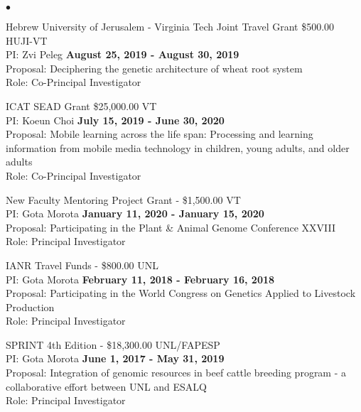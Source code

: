 \documentclass[margin,line,10pt]{res}
\newenvironment{list2}{
  \begin{list}{$\bullet$}{%
      \setlength{\itemsep}{0in}
      \setlength{\parsep}{0in} \setlength{\parskip}{0in}
      \setlength{\topsep}{0in} \setlength{\partopsep}{0in} 
      \setlength{\leftmargin}{0.2in}}}{\end{list}}
\begin{document}
\begin{resume}
\begin{list2}


\item  Hebrew University of Jerusalem - Virginia Tech Joint Travel Grant \$500.00  \hfill HUJI-VT\\
PI: Zvi Peleg  \hfill \textbf{August 25, 2019 - August 30, 2019}\\
Proposal: Deciphering the genetic architecture of wheat root system \\
Role: Co-Principal Investigator \\


\vspace{0.5cm}



\item ICAT SEAD Grant \$25,000.00  \hfill VT\\
PI: Koeun Choi  \hfill \textbf{July 15, 2019 - June 30, 2020}\\
Proposal:  Mobile learning across the life span: Processing and learning information from mobile media technology in children, young adults, and older adults \\
Role: Co-Principal Investigator \\


\vspace{0.5cm}

\item New Faculty Mentoring Project Grant  - \$1,500.00  \hfill VT\\
PI: Gota Morota   \hfill \textbf{January 11, 2020 - January 15, 2020}\\
Proposal: Participating in the Plant \& Animal Genome Conference XXVIII\\
Role: Principal Investigator \\


\vspace{0.5cm}

\item IANR Travel Funds  - \$800.00  \hfill UNL\\
PI: Gota Morota   \hfill \textbf{February 11, 2018 - February 16, 2018}\\
Proposal: Participating in the World Congress on Genetics Applied to Livestock Production  \\
Role: Principal Investigator \\


\vspace{0.5cm}

\item SPRINT 4th Edition  - \$18,300.00  \hfill UNL/FAPESP\\
PI: Gota Morota   \hfill \textbf{June 1, 2017 - May 31, 2019}\\
Proposal: Integration of genomic resources in beef cattle breeding program - a collaborative effort between UNL and ESALQ  \\
Role: Principal Investigator \\



\end{list2}
\end{resume}
\end{document}
